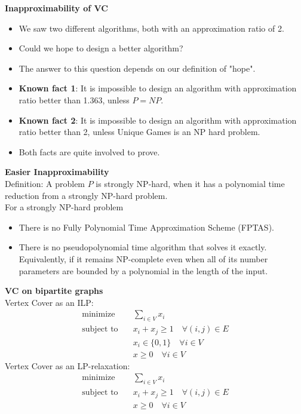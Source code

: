 \documentclass[onecolumn]{report}
\begin{document}
\textbf{Inapproximability of VC}\\
\begin{itemize}
    \item We saw two different algorithms, both with an approximation ratio of 2.
    \item Could we hope to design a better algorithm?
    \item The answer to this question depends on our definition of "hope".
    \item \textbf{Known fact 1}: It is impossible to design an algorithm with approximation ratio better than 1.363, unless $P=NP$.
    \item \textbf{Known fact 2}: It is impossible to design an algorithm with approximation ratio better than 2, unless Unique Games is an NP hard problem.
    \item Both facts are quite involved to prove.
\end{itemize}
\textbf{Easier Inapproximability}\\
Definition: A problem $P$ is strongly NP-hard, when it has a polynomial time reduction from a strongly NP-hard problem.\\
For a strongly NP-hard problem
\begin{itemize}
    \item There is no Fully Polynomial Time Approximation Scheme (FPTAS).
    \item There is no pseudopolynomial time algorithm that solves it exactly.
    \subitem Equivalently, if it remains NP-complete even when all of its number parameters are bounded by a polynomial in the length of the input.
\end{itemize}
\textbf{VC on bipartite graphs}\\
Vertex Cover as an ILP:
\begin{equation*}
    \begin{aligned}
    \text{minimize} \quad & \sum_{i \in V} x_i\\
    \text{subject to} \quad & x_i + x_j \geq 1 \quad \forall (i,j) \in E\\
    & x_i \in \{0,1\} \quad \forall i \in V \\
    & x \geq 0 \quad \forall i \in V
    \end{aligned}
\end{equation*}
Vertex Cover as an LP-relaxation:
\begin{equation*}
    \begin{aligned}
    \text{minimize} \quad & \sum_{i \in V} x_i\\
    \text{subject to} \quad & x_i + x_j \geq 1 \quad \forall (i,j) \in E\\
    & x \geq 0 \quad \forall i \in V
    \end{aligned}
\end{equation*}
\end{document}
